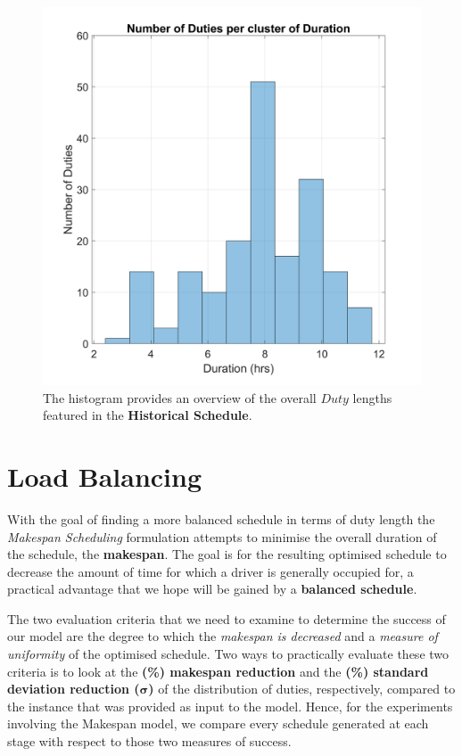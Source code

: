 \begin{figure}[ht]
\begin{center}
\includegraphics[width=0.46\linewidth]{[1] - chapter/Image Files/Historical-for-evaluation.png}
    
\end{center}
   \caption{The histogram provides an overview of the overall $Duty$ lengths featured in the \textbf{Historical Schedule}.}
\label{fig: Historical for Evaluation.}
\end{figure}


\section{Load Balancing}
\label{section:Makespan Scheduling-content}
With the goal of finding a more balanced schedule in terms of duty length the \textit{Makespan Scheduling} formulation attempts to minimise the overall duration of the schedule, the \textbf{makespan}. The goal is for the resulting optimised schedule to decrease the amount of time for which a driver is generally occupied for, a practical advantage that we hope will be gained by a \textbf{balanced schedule}.

\vspace{\baselineskip}
\noindent
The two evaluation criteria that we need to examine to determine the success of our model are the degree to which the \textit{makespan is decreased} and a \textit{measure of uniformity} of the optimised schedule. Two ways to practically evaluate these two criteria is to look at the \textbf{(\%) makespan reduction} and the \textbf{(\%) standard deviation reduction ($\pmb{\sigma}$)} of the distribution of duties, respectively, compared to the instance that was provided as input to the model. Hence, for the experiments involving the Makespan model, we compare every schedule generated at each stage with respect to those two measures of success. 

